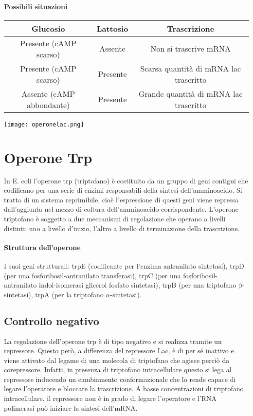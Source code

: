 \documentclass{article}
\begin{document}
\paragraph{Possibili situazioni}
\begin{center}
    \begin{tabular}{c|c|c}
            \toprule
            Glucosio & Lattosio & Trascrizione\\
            \midrule
            Presente (cAMP scarso) & Assente & Non si trascrive mRNA\\
            Presente (cAMP scarso) & Presente & Scarsa quantità di mRNA lac trascritto\\
            Assente (cAMP abbondante) & Presente & Grande quantità di mRNA lac trascritto\\
            \bottomrule
    \end{tabular}
\end{center}

\begin{center}
    \texttt{[image: operonelac.png]}
\end{center}

\section{Operone Trp} In E. coli l'operone trp (triptofano) è costituito da un
gruppo di geni contigui che codificano per una serie di enzimi responsabili della
sintesi dell'amminoacido. Si tratta di un
sistema reprimibile, cioè l'espressione di questi geni viene repressa dall'aggiunta
nel mezzo di coltura dell'amminoacido corrispondente. L'operone triptofano è
soggetto a due meccanismi di regolazione che operano a livelli distinti: uno a
livello d'inizio, l'altro a livello di terminazione della trascrizione.
\paragraph{Struttura dell'operone}
I suoi geni strutturali: trpE (codificante per l'enzima antranilato sintetasi), trpD (per una fosforibosil-antranilato transferasi), trpC (per una
fosforibosil-antranilato indol-isomerasi glicerol fosfato sintetasi), trpB (per una
triptofano $\beta$-sintetasi), trpA (per la triptofano $\alpha$-sintetasi).
\subsection{Controllo negativo}
La regolazione dell'operone trp è di tipo negativo e si realizza tramite un
repressore. Questo però, a differenza del repressore Lac, è di per sé inattivo e
viene attivato dal legame di una molecola di triptofano che agisce perciò da
corepressore. Infatti, in presenza di triptofano intracellulare questo si lega al
repressore inducendo un cambiamento conformazionale che lo rende capace di
legare l'operatore e bloccare la trascrizione. A basse concentrazioni di triptofano intracellulare, il repressore non è in grado 
di legare l'operatore e l'RNA polimerasi può iniziare la sintesi dell'mRNA.\\
\end{document}
